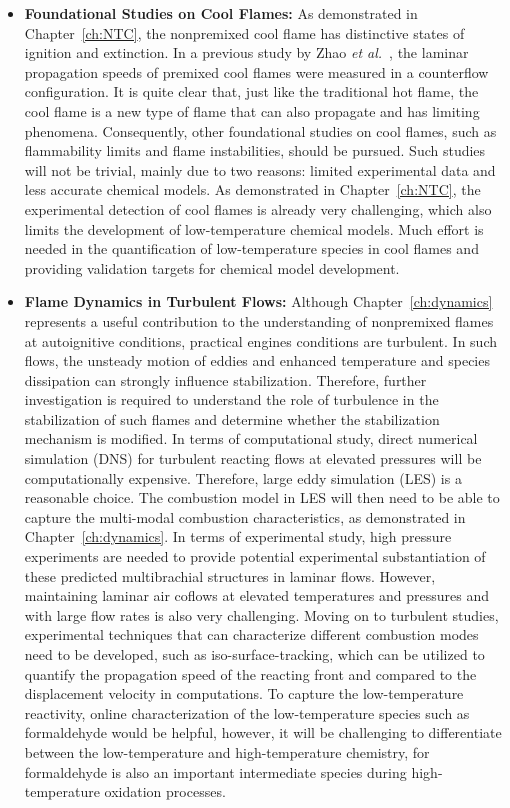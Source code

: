 \begin{itemize}
\item \textbf{Foundational Studies on Cool Flames:} As demonstrated in Chapter~\ref{ch:NTC}, the nonpremixed cool flame has distinctive states of ignition and extinction.  In a previous study by Zhao \emph{et al.}~\cite{zhao16}, the laminar propagation speeds of premixed cool flames were measured in a counterflow configuration.  It is quite clear that, just like the traditional hot flame, the cool flame is a new type of flame that can also propagate and has limiting phenomena.  Consequently, other foundational studies on cool flames, such as flammability limits and flame instabilities, should be pursued.  Such studies will not be trivial, mainly due to two reasons: limited experimental data and less accurate chemical models.  As demonstrated in Chapter~\ref{ch:NTC}, the experimental detection of cool flames is already very challenging, which also limits the development of low-temperature chemical models.  Much effort is needed in the quantification of low-temperature species in cool flames and providing validation targets for chemical model development.

\item \textbf{Flame Dynamics in Turbulent Flows:} Although Chapter~\ref{ch:dynamics} represents a useful contribution to the understanding of nonpremixed flames at autoignitive conditions, practical engines conditions are turbulent.  In such flows, the unsteady motion of eddies and enhanced temperature and species dissipation can strongly influence stabilization.  Therefore, further investigation is required to understand the role of turbulence in the stabilization of such flames and determine whether the stabilization mechanism is modified.  In terms of computational study, direct numerical simulation (DNS) for turbulent reacting flows at elevated pressures will be computationally expensive.  Therefore, large eddy simulation (LES) is a reasonable choice.  The combustion model in LES will then need to be able to capture the multi-modal combustion characteristics, as demonstrated in Chapter~\ref{ch:dynamics}.  In terms of experimental study, high pressure experiments are needed to provide potential experimental substantiation of these predicted multibrachial structures in laminar flows.  However, maintaining laminar air coflows at elevated temperatures and pressures and with large flow rates is also very challenging.  Moving on to turbulent studies, experimental techniques that can characterize different combustion modes need to be developed, such as iso-surface-tracking, which can be utilized to quantify the propagation speed of the reacting front and compared to the displacement velocity in computations.  To capture the low-temperature reactivity, online characterization of the low-temperature species such as formaldehyde would be helpful, however, it will be challenging to differentiate between the low-temperature and high-temperature chemistry, for formaldehyde is also an important intermediate species during high-temperature oxidation processes.


\end{itemize}
